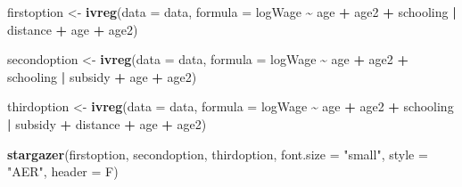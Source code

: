 \documentclass[
]{article}
\newenvironment{Shaded}{\begin{snugshade}}{\end{snugshade}}
\newcommand{\DataTypeTok}[1]{\textcolor[rgb]{0.13,0.29,0.53}{#1}}
\newcommand{\KeywordTok}[1]{\textcolor[rgb]{0.13,0.29,0.53}{\textbf{#1}}}
\newcommand{\NormalTok}[1]{#1}
\newcommand{\OperatorTok}[1]{\textcolor[rgb]{0.81,0.36,0.00}{\textbf{#1}}}
\newcommand{\StringTok}[1]{\textcolor[rgb]{0.31,0.60,0.02}{#1}}
\begin{document}
\begin{Shaded}
\begin{Highlighting}[]
\NormalTok{firstoption \textless{}{-}}\StringTok{ }\KeywordTok{ivreg}\NormalTok{(}\DataTypeTok{data =}\NormalTok{ data, }\DataTypeTok{formula =} 
\NormalTok{                         logWage }\OperatorTok{\textasciitilde{}}\StringTok{ }\NormalTok{age }\OperatorTok{+}\StringTok{ }\NormalTok{age2 }\OperatorTok{+}\StringTok{ }\NormalTok{schooling }\OperatorTok{|}\StringTok{ }\NormalTok{distance }\OperatorTok{+}\StringTok{ }\NormalTok{age }\OperatorTok{+}\StringTok{ }\NormalTok{age2)}

\NormalTok{secondoption \textless{}{-}}\StringTok{ }\KeywordTok{ivreg}\NormalTok{(}\DataTypeTok{data =}\NormalTok{ data, }\DataTypeTok{formula =}
\NormalTok{                          logWage }\OperatorTok{\textasciitilde{}}\StringTok{ }\NormalTok{age }\OperatorTok{+}\StringTok{ }\NormalTok{age2 }\OperatorTok{+}\StringTok{ }\NormalTok{schooling }\OperatorTok{|}\StringTok{ }\NormalTok{subsidy }\OperatorTok{+}\StringTok{ }\NormalTok{age }\OperatorTok{+}\StringTok{ }\NormalTok{age2)}

\NormalTok{thirdoption \textless{}{-}}\StringTok{ }\KeywordTok{ivreg}\NormalTok{(}\DataTypeTok{data =}\NormalTok{ data, }\DataTypeTok{formula =}
\NormalTok{                          logWage }\OperatorTok{\textasciitilde{}}\StringTok{ }\NormalTok{age }\OperatorTok{+}\StringTok{ }\NormalTok{age2 }\OperatorTok{+}\StringTok{ }\NormalTok{schooling }\OperatorTok{|}\StringTok{ }\NormalTok{subsidy }\OperatorTok{+}\StringTok{ }\NormalTok{distance }\OperatorTok{+}\StringTok{ }\NormalTok{age }\OperatorTok{+}\StringTok{ }\NormalTok{age2)}
\end{Highlighting}
\end{Shaded}

\begin{Shaded}
\begin{Highlighting}[]
\KeywordTok{stargazer}\NormalTok{(firstoption, secondoption, thirdoption, }\DataTypeTok{font.size =} \StringTok{"small"}\NormalTok{, }
          \DataTypeTok{style =} \StringTok{"AER"}\NormalTok{, }
          \DataTypeTok{header =}\NormalTok{ F)}
\end{Highlighting}
\end{Shaded}
\end{document}
